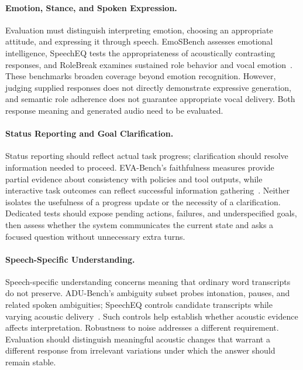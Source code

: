 \paragraph{Emotion, Stance, and Spoken Expression.}
\label{sec:61halfduplex-emotion-expression}
Evaluation must distinguish interpreting emotion, choosing an appropriate attitude, and expressing it through speech. EmoSBench assesses emotional intelligence, SpeechEQ tests the appropriateness of acoustically contrasting responses, and RoleBreak examines sustained role behavior and vocal emotion~\citep{61halfduplex-emosbench,61halfduplex-speecheq,61halfduplex-rolebreak}. These benchmarks broaden coverage beyond emotion recognition. However, judging supplied responses does not directly demonstrate expressive generation, and semantic role adherence does not guarantee appropriate vocal delivery. Both response meaning and generated audio need to be evaluated.

\paragraph{Status Reporting and Goal Clarification.}
\label{sec:61halfduplex-status-clarification}
Status reporting should reflect actual task progress; clarification should resolve information needed to proceed. EVA-Bench's faithfulness measures provide partial evidence about consistency with policies and tool outputs, while interactive task outcomes can reflect successful information gathering~\citep{61halfduplex-evabench,61halfduplex-tauvoice}. Neither isolates the usefulness of a progress update or the necessity of a clarification. Dedicated tests should expose pending actions, failures, and underspecified goals, then assess whether the system communicates the current state and asks a focused question without unnecessary extra turns.

\paragraph{Speech-Specific Understanding.}
\label{sec:61halfduplex-speech-understanding}
Speech-specific understanding concerns meaning that ordinary word transcripts do not preserve. ADU-Bench's ambiguity subset probes intonation, pauses, and related spoken ambiguities; SpeechEQ controls candidate transcripts while varying acoustic delivery~\citep{61halfduplex-adubench,61halfduplex-speecheq}. Such controls help establish whether acoustic evidence affects interpretation. Robustness to noise addresses a different requirement. Evaluation should distinguish meaningful acoustic changes that warrant a different response from irrelevant variations under which the answer should remain stable.

